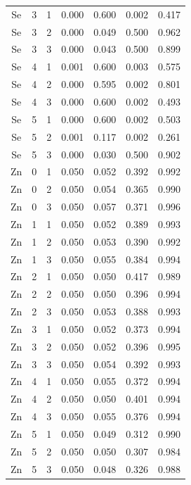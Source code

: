 \documentclass[ms, hidelinks]{uncgdissertationexp3}
\theoremstyle{plain}
\theoremstyle{definition}
\theoremstyle{remark}
\begin{document}
\begin{longtable}{ccccccc}
  Se & 3 & 1 & 0.000 & 0.600 & 0.002 & 0.417\\
  \rowcolor{gray!6}  Se & 3 & 2 & 0.000 & 0.049 & 0.500 & 0.962\\
  Se & 3 & 3 & 0.000 & 0.043 & 0.500 & 0.899\\
  \rowcolor{gray!6}  Se & 4 & 1 & 0.001 & 0.600 & 0.003 & 0.575\\
  Se & 4 & 2 & 0.000 & 0.595 & 0.002 & 0.801\\
  \rowcolor{gray!6}  Se & 4 & 3 & 0.000 & 0.600 & 0.002 & 0.493\\
  Se & 5 & 1 & 0.000 & 0.600 & 0.002 & 0.503\\
  \rowcolor{gray!6}  Se & 5 & 2 & 0.001 & 0.117 & 0.002 & 0.261\\
  Se & 5 & 3 & 0.000 & 0.030 & 0.500 & 0.902\\
  \rowcolor{gray!6}  Zn & 0 & 1 & 0.050 & 0.052 & 0.392 & 0.992\\
  Zn & 0 & 2 & 0.050 & 0.054 & 0.365 & 0.990\\
  \rowcolor{gray!6}  Zn & 0 & 3 & 0.050 & 0.057 & 0.371 & 0.996\\
  Zn & 1 & 1 & 0.050 & 0.052 & 0.389 & 0.993\\
  \rowcolor{gray!6}  Zn & 1 & 2 & 0.050 & 0.053 & 0.390 & 0.992\\
  Zn & 1 & 3 & 0.050 & 0.055 & 0.384 & 0.994\\
  \rowcolor{gray!6}  Zn & 2 & 1 & 0.050 & 0.050 & 0.417 & 0.989\\
  Zn & 2 & 2 & 0.050 & 0.050 & 0.396 & 0.994\\
  \rowcolor{gray!6}  Zn & 2 & 3 & 0.050 & 0.053 & 0.388 & 0.993\\
  Zn & 3 & 1 & 0.050 & 0.052 & 0.373 & 0.994\\
  \rowcolor{gray!6}  Zn & 3 & 2 & 0.050 & 0.052 & 0.396 & 0.995\\
  Zn & 3 & 3 & 0.050 & 0.054 & 0.392 & 0.993\\
  \rowcolor{gray!6}  Zn & 4 & 1 & 0.050 & 0.055 & 0.372 & 0.994\\
  Zn & 4 & 2 & 0.050 & 0.050 & 0.401 & 0.994\\
  \rowcolor{gray!6}  Zn & 4 & 3 & 0.050 & 0.055 & 0.376 & 0.994\\
  Zn & 5 & 1 & 0.050 & 0.049 & 0.312 & 0.990\\
  \rowcolor{gray!6}  Zn & 5 & 2 & 0.050 & 0.050 & 0.307 & 0.984\\
  Zn & 5 & 3 & 0.050 & 0.048 & 0.326 & 0.988\\*
  \end{longtable}
\end{document}
